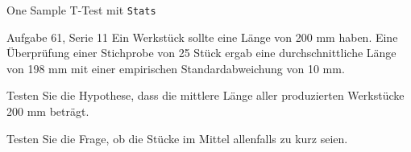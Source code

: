 \documentclass[handout]{beamer}
\begin{document}
\begin{frame}{One Sample T-Test mit \texttt{Stats}}
\begin{beamerboxesrounded}[shadow]{Aufgabe 61, Serie 11}
Ein Werkstück sollte eine Länge von 200 mm haben. Eine Überprüfung einer
Stichprobe von 25 Stück ergab eine durchschnittliche Länge von 198 mm mit einer
empirischen Standardabweichung von 10 mm.

\begin{outline}
\item Testen Sie die Hypothese, dass die mittlere Länge aller produzierten Werkstücke 200 mm beträgt.
\item Testen Sie die Frage, ob die Stücke im Mittel allenfalls zu kurz seien.
\end{outline}
\end{beamerboxesrounded}
\end{frame}


%
%
%
%
\end{document}
